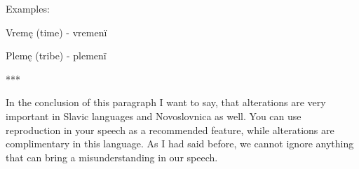Examples:

Vremę (time) \textipa{[‘vrEmj\~E]} - vremenï 

Plemę (tribe) \textipa{[‘plEmj\~E]} - plemenï 

***

In the conclusion of this paragraph I want to say, that alterations are very important in Slavic languages and Novoslovnica as well. You can use reproduction in your speech as a recommended feature, while alterations are complimentary in this language. As I had said before, we cannot ignore anything that can bring a misunderstanding in our speech. 
